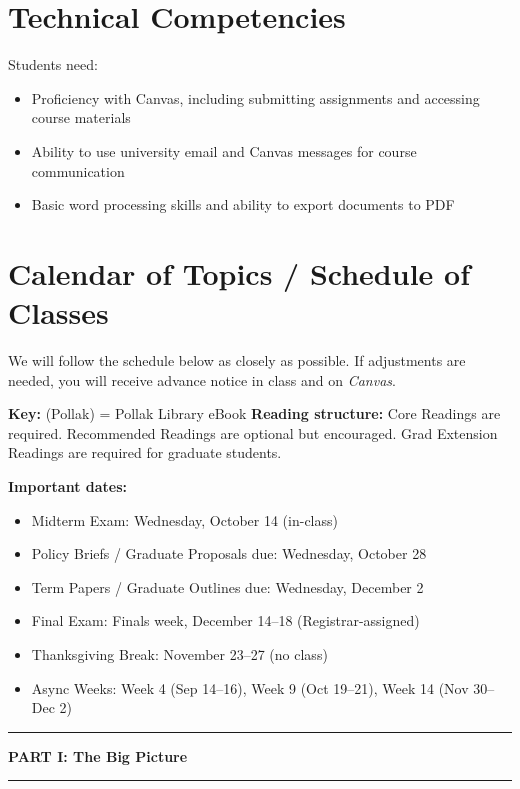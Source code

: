 \documentclass[12pt]{article}
\begin{document}
\section*{Technical Competencies}
Students need:
\begin{itemize}
\item Proficiency with Canvas, including submitting assignments and accessing course materials
\item Ability to use university email and Canvas messages for course communication
\item Basic word processing skills and ability to export documents to PDF
\end{itemize}

\section*{Calendar of Topics / Schedule of Classes}

We will follow the schedule below as closely as possible. If adjustments are needed, you will receive advance notice in class and on \emph{Canvas}.

\vspace{0.5em}
\noindent \textbf{Key:} (Pollak) = Pollak Library eBook
\noindent \textbf{Reading structure:} Core Readings are required. Recommended Readings are optional but encouraged. Grad Extension Readings are required for graduate students.

\vspace{0.5em}
\noindent \textbf{Important dates:}
\begin{itemize}
    \item Midterm Exam: Wednesday, October 14 (in-class)
    \item Policy Briefs / Graduate Proposals due: Wednesday, October 28
    \item Term Papers / Graduate Outlines due: Wednesday, December 2
    \item Final Exam: Finals week, December 14--18 (Registrar-assigned)
    \item Thanksgiving Break: November 23--27 (no class)
    \item Async Weeks: Week 4 (Sep 14--16), Week 9 (Oct 19--21), Week 14 (Nov 30--Dec 2)
\end{itemize}

\bigskip

\noindent\rule{\textwidth}{0.6pt}
\begin{center}\textbf{PART I: The Big Picture}\end{center}
\noindent\rule{\textwidth}{0.6pt}
\end{document}
